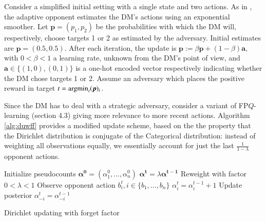 Consider a simplified initial setting with a single state and
two actions. As in  \parencite{leike2017ai}, the adaptive
opponent estimates the DM's actions using an exponential smoother.
Let $\bm{p} = (p_1, p_2)$ be the probabilities
with which the DM will, respectively, choose targets 1 or 2
as estimated by the adversary. 
Initial estimates %
are
$\bm{p} = (0.5, 0.5)$.
After each iteration, the update is %
$
\bm{p} := \beta \bm{p} + (1 - \beta ) \bm{a},
$
with $0 < \beta < 1$ 
a learning rate, unknown from the DM's point of view,
and $\bm{a} \in \lbrace (1, 0), (0, 1) \rbrace$ is a one-hot encoded
vector respectively indicating whether the DM  chose targets 1 or 2. 
Assume an adversary which places the positive reward in target
$t = \operatorname*{argmin}_i (\bm{p})_i$.


Since the DM has to deal with a strategic adversary, 
consider a variant of FP$Q$-learning (section 4.3) giving
more relevance to more recent actions.
Algorithm \ref{alg:duwff} provides a modified update 
scheme, based on the the property that the Dirichlet distribution is conjugate of the Categorical distribution: 
 instead of weighting all observations equally,
 we essentially account for just the last $\frac{1}{1 - \lambda}$ 
 opponent actions.  
 \begin{algorithm}
\begin{algorithmic}[1]
\State Initialize pseudocounts $ \bm{\alpha^0} = (\alpha^0_1, \ldots, \alpha^0_n)$
\State $\bm{\alpha^t} = \lambda \bm{\alpha^{t-1}}$ \Comment Reweight with factor $0 < \lambda < 1$
\State Observe opponent action $b^t_i, i \in \lbrace b_1, \ldots, b_n \rbrace$
\State $\alpha^t_i = \alpha^{t-1}_i + 1$ \Comment Update posterior
\State $\alpha^t_{-i} = \alpha^{t-1}_{-i}$
\EndFor
\end{algorithmic}
\caption{Dirichlet updating with forget factor}
\label{alg:duwff}
\end{algorithm}

